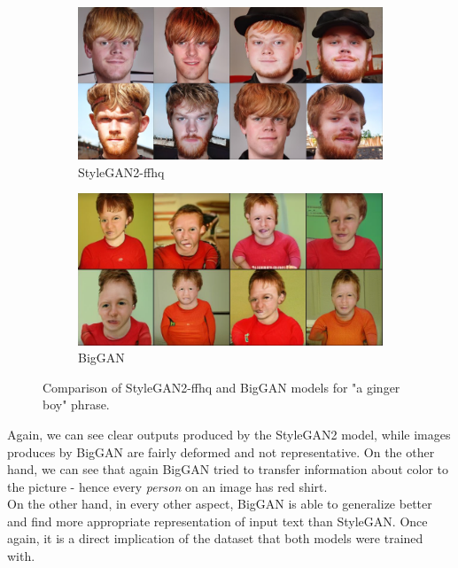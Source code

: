 \documentclass[12pt,a4paper,openany]{book}
\begin{document}
\begin{figure}[H]
\centering
\begin{subfigure}[b]{1.0\textwidth}
   \includegraphics[width=1\linewidth]{gingerboy_stylegan.PNG}
   \caption{StyleGAN2-ffhq}
   \label{fig:Ng1} 
\end{subfigure}

\begin{subfigure}[b]{1.0\textwidth}
   \includegraphics[width=1\linewidth]{gingerboy_biggan.PNG}
   \caption{BigGAN}
   \label{fig:Ng2}
\end{subfigure}
\caption[pics]{Comparison of StyleGAN2-ffhq and BigGAN models for "a ginger boy" phrase.}
\end{figure}

\noindent Again, we can see clear outputs produced by the StyleGAN2 model, while images produces by BigGAN are fairly deformed and not representative. On the other hand, we can see that again BigGAN tried to transfer information about color to the picture - hence every \textit{person} on an image has red shirt.\\

\noindent On the other hand, in every other aspect, BigGAN is able to generalize better and find more appropriate representation of input text than StyleGAN. Once again, it is a direct implication of the dataset that both models were trained with. 
\end{document}
